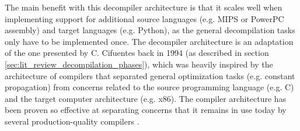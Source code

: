 The main benefit with this decompiler architecture is that it scales well when implementing support for additional source languages (e.g. MIPS or PowerPC assembly) and target languages (e.g. Python), as the general decompilation tasks only have to be implemented once. The decompiler architecture is an adaptation of the one presented by C. Cifuentes back in 1994 (as described in section \ref{sec:lit_review_decompilation_phases}), which was heavily inspired by the architecture of compilers that separated general optimization tasks (e.g. constant propagation) from concerns related to the source programming language (e.g. C) and the target computer architecture (e.g. x86). The compiler architecture has been proven so effective at separating concerns that it remains in use today by several production-quality compilers \cite{llvm_architecture,gcc_architecture}.
